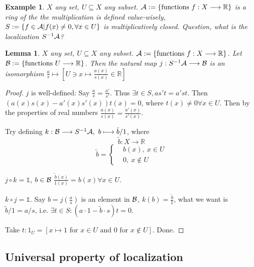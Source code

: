 \documentclass[11pt]{article}
\newtheorem{lemma}[thm]{Lemma}
\newtheorem{ex}[thm]{Example}
\newcommand{\reals}{\mathbb R}
\newcommand{\cala}{{\cal A}}
\newcommand{\calb}{{\cal B}}
\newcommand{\lrta}{\longrightarrow}
\begin{document}
\begin{ex}
$X$ any set, $U\subseteq X$ any subset.
$\cala:=\{\text{functions } f:X\lrta \reals\}$ is a ring of the the multiplication is defined value-wisely, $S:=\{f\in \cala| f(x)\neq 0, \forall x\in U\}$ is multiplicatively closed. Question, what is the localization $S^{-1}\cala$?
\end{ex}
\begin{lemma}$X$ any set, $U\subseteq X$ any subset.
$\cala:=\{\text{functions } f:X\lrta \reals\}$.
Let $\calb:=\{\text{functions }U\lrta \reals\}$.
Then the natural map $j:S^{-1}\cala\lrta \calb$ is an isomorphism $\frac{a}{s}\mapsto [U\ni x\mapsto\frac{a(x)}{s(x)}\in\reals]$
\end{lemma}
\begin{proof}
$j$ is well-defined:
Say $\frac{a}{s}=\frac{a'}{s'}$. Thus $\exists t\in S, a s' t=a' s t$. Then $(a(x)s(x)-a'(x)s'(x))t(x)=0$, where $t(x)\neq0\forall x\in U$. Then by the properties of real numbers $\frac{a(x)}{s(x)}=\frac{a'(x)}{s'(x)}$.

Try defining $k:\calb\lrta S^{-1}\cala,\ b\longmapsto \tilde{b}/1$, where
$$
\tilde{b}:X\lrta \reals
$$
$$
\tilde{b}=\left\{
\begin{aligned}
&b(x),\ x\in U\\
&0, \ x\notin U
\end{aligned}
\right.
$$

$j\circ k=\mathds{1}$, $b\in \calb$
$\frac{\tilde{b}(x)}{1(x)}=b(x)\forall x\in U$.

$k\circ j=\mathds{1}$. Say $b=j(\frac{a}{s})$ is an element in $\calb$, $k(b)=\frac{\tilde{b}}{1}$, what we want is $\tilde{b}/1=a/s$, i.e. $\exists t\in S:(a\cdot 1-\tilde{b}\cdot s)t=0$.

Take $t:1_U=[x\mapsto 1 \text{ for }x\in U \text{ and } 0 \text{ for } x\not \in U]$. Done.
\end{proof}

\subsection*{Universal property of localization}
\end{document}
